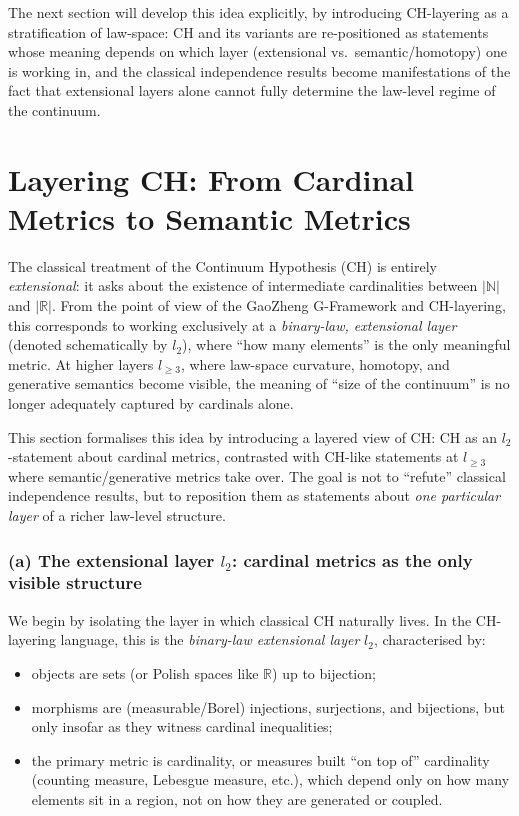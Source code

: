 \documentclass[11pt]{book}
\theoremstyle{plain}
\theoremstyle{definition}
\begin{document}
The next section will develop this idea explicitly, by introducing
CH-layering as a stratification of law-space: CH and its variants are
re-positioned as statements whose meaning depends on which layer
(extensional vs.\ semantic/homotopy) one is working in, and the
classical independence results become manifestations of the fact that
extensional layers alone cannot fully determine the law-level regime of
the continuum.



\section{Layering CH: From Cardinal Metrics to Semantic Metrics}


The classical treatment of the Continuum Hypothesis (CH) is entirely
\emph{extensional}: it asks about the existence of intermediate
cardinalities between $|\mathbb{N}|$ and $|\mathbb{R}|$. From the point
of view of the GaoZheng G-Framework and CH-layering, this corresponds
to working exclusively at a \emph{binary-law, extensional layer}
(denoted schematically by $l_2$), where “how many elements” is the
only meaningful metric. At higher layers $l_{\ge3}$, where law-space
curvature, homotopy, and generative semantics become visible, the
meaning of “size of the continuum” is no longer adequately captured by
cardinals alone.

This section formalises this idea by introducing a layered view of CH:
CH as an $l_2$-statement about cardinal metrics, contrasted with
CH-like statements at $l_{\ge3}$ where semantic/generative metrics
take over. The goal is not to “refute” classical independence results,
but to reposition them as statements about \emph{one particular layer}
of a richer law-level structure.



\subsubsection*{(a) The extensional layer $l_2$: cardinal metrics as the only visible structure}

We begin by isolating the layer in which classical CH naturally lives.
In the CH-layering language, this is the \emph{binary-law extensional
layer} $l_2$, characterised by:

\begin{itemize}
  \item objects are sets (or Polish spaces like $\mathbb{R}$) up to
        bijection;
  \item morphisms are (measurable/Borel) injections, surjections, and
        bijections, but only insofar as they witness cardinal
        inequalities;
  \item the primary metric is cardinality, or measures built “on top
        of” cardinality (counting measure, Lebesgue measure, etc.),
        which depend only on how many elements sit in a region, not on
        how they are generated or coupled.
\end{itemize}
\end{document}

